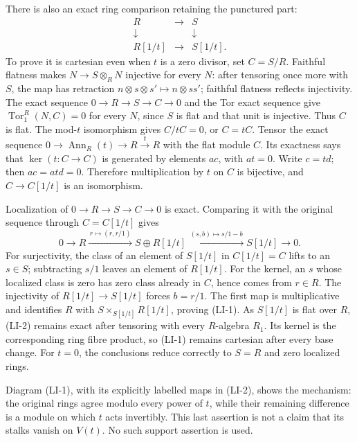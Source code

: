 There is also an exact ring comparison retaining the punctured part: \[
\begin{matrix}
R&\longrightarrow&S\\
\downarrow&&\downarrow\\
R[1/t]&\longrightarrow&S[1/t].
\end{matrix}
\tag{LI-1}
\] To prove it is cartesian even when \(t\) is a zero divisor, set \(C=S/R\). Faithful flatness makes \(N\to S\otimes_R N\) injective for every \(N\): after tensoring once more with \(S\), the map has retraction \(n\otimes s\otimes s'\mapsto n\otimes ss'\); faithful flatness reflects injectivity. The exact sequence \(0\to R\to S\to C\to0\) and the Tor exact sequence give \(\operatorname{Tor}_1^R(N,C)=0\) for every \(N\), since \(S\) is flat and that unit is injective. Thus \(C\) is flat. The mod-\(t\) isomorphism gives \(C/tC=0\), or \(C=tC\). Tensor the exact sequence \(0\to\operatorname{Ann}_R(t)\to R\xrightarrow{t}R\) with the flat module \(C\). Its exactness says that \(\ker(t:C\to C)\) is generated by elements \(ac\), with \(at=0\). Write \(c=td\); then \(ac=atd=0\). Therefore multiplication by \(t\) on \(C\) is bijective, and \(C\to C[1/t]\) is an isomorphism.

Localization of \(0\to R\to S\to C\to0\) is exact. Comparing it with the original sequence through \(C=C[1/t]\) gives \[
0\longrightarrow R
\xrightarrow{\,r\mapsto(r,r/1)\,} S\oplus R[1/t]
\xrightarrow{\,(s,b)\mapsto s/1-b\,}S[1/t]
\longrightarrow0.
\tag{LI-2}
\] For surjectivity, the class of an element of \(S[1/t]\) in \(C[1/t]=C\) lifts to an \(s\in S\); subtracting \(s/1\) leaves an element of \(R[1/t]\). For the kernel, an \(s\) whose localized class is zero has zero class already in \(C\), hence comes from \(r\in R\). The injectivity of \(R[1/t]\to S[1/t]\) forces \(b=r/1\). The first map is multiplicative and identifies \(R\) with \(S\times_{S[1/t]}R[1/t]\), proving (LI-1). As \(S[1/t]\) is flat over \(R\), (LI-2) remains exact after tensoring with every \(R\)-algebra \(R_1\). Its kernel is the corresponding ring fibre product, so (LI-1) remains cartesian after every base change. For \(t=0\), the conclusions reduce correctly to \(S=R\) and zero localized rings.

Diagram (LI-1), with its explicitly labelled maps in (LI-2), shows the mechanism: the original rings agree modulo every power of \(t\), while their remaining difference is a module on which \(t\) acts invertibly. This last assertion is not a claim that its stalks vanish on \(V(t)\). No such support assertion is used.

